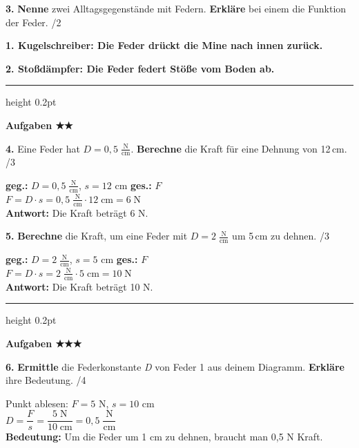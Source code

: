\documentclass[10pt,a4paper]{article}
\newcommand{\lsg}[1]{\textcolor{loesung}{\textbf{#1}}}
\newcommand{\punkte}[1]{\hfill\textcolor{grau}{\small/#1}}
\newcommand{\stern}[1]{\textcolor{physik}{\textbf{#1}}}
\newcommand{\fv}[1]{\textit{#1}}
\newcommand{\op}[1]{\textbf{#1}}
\newcommand{\rechenplatzlsg}[1]{\vspace{2mm}\textcolor{loesung}{#1}\vspace{6mm}}
\begin{document}
\textbf{3.} \op{Nenne} zwei Alltagsgegenstände mit Federn. \op{Erkläre} bei einem die Funktion der Feder. \punkte{2}

\vspace{2mm}

\lsg{1. Kugelschreiber: Die Feder drückt die Mine nach innen zurück.}

\lsg{2. Stoßdämpfer: Die Feder federt Stöße vom Boden ab.}

\vspace{6mm}

\hrule height 0.2pt
\vspace{4mm}

\textbf{\textcolor{physik}{Aufgaben \stern{★★}}}

\vspace{3mm}

\textbf{4.} Eine Feder hat $\fv{D} = 0{,}5\;\frac{\text{N}}{\text{cm}}$. \op{Berechne} die Kraft für eine Dehnung von 12\,cm. \punkte{3}

\rechenplatzlsg{%
\textbf{geg.:} $D = 0{,}5\;\frac{\text{N}}{\text{cm}}$, $s = 12$ cm \quad \textbf{ges.:} $F$\\[2mm]
$F = D \cdot s = 0{,}5\;\frac{\text{N}}{\text{cm}} \cdot 12\;\text{cm} = 6\;\text{N}$\\[2mm]
\textbf{Antwort:} Die Kraft beträgt 6 N.
}

\textbf{5.} \op{Berechne} die Kraft, um eine Feder mit $\fv{D} = 2\;\frac{\text{N}}{\text{cm}}$ um 5\,cm zu dehnen. \punkte{3}

\rechenplatzlsg{%
\textbf{geg.:} $D = 2\;\frac{\text{N}}{\text{cm}}$, $s = 5$ cm \quad \textbf{ges.:} $F$\\[2mm]
$F = D \cdot s = 2\;\frac{\text{N}}{\text{cm}} \cdot 5\;\text{cm} = 10\;\text{N}$\\[2mm]
\textbf{Antwort:} Die Kraft beträgt 10 N.
}

\hrule height 0.2pt
\vspace{4mm}

\textbf{\textcolor{physik}{Aufgaben \stern{★★★}}}

\vspace{3mm}

\textbf{6.} \op{Ermittle} die Federkonstante \fv{D} von Feder 1 aus deinem Diagramm. \op{Erkläre} ihre Bedeutung. \punkte{4}

\rechenplatzlsg{%
Punkt ablesen: $F = 5$ N, $s = 10$ cm\\[2mm]
$D = \dfrac{F}{s} = \dfrac{5\;\text{N}}{10\;\text{cm}} = 0{,}5\;\dfrac{\text{N}}{\text{cm}}$\\[2mm]
\textbf{Bedeutung:} Um die Feder um 1 cm zu dehnen, braucht man 0,5 N Kraft.
}
\end{document}
